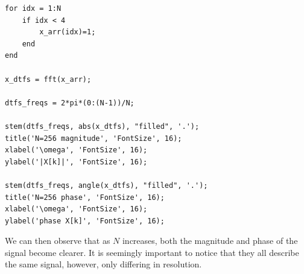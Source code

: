 \documentclass[12pt]{article}
\begin{document}
\begin{enumerate}[label=\textbf{\alph*)}, leftmargin=2.6em]
\begin{verbatim}
for idx = 1:N
    if idx < 4
        x_arr(idx)=1;
    end
end

x_dtfs = fft(x_arr);

dtfs_freqs = 2*pi*(0:(N-1))/N;

stem(dtfs_freqs, abs(x_dtfs), "filled", '.');
title('N=256 magnitude', 'FontSize', 16);
xlabel('\omega', 'FontSize', 16);
ylabel('|X[k]|', 'FontSize', 16);

stem(dtfs_freqs, angle(x_dtfs), "filled", '.');
title('N=256 phase', 'FontSize', 16);
xlabel('\omega', 'FontSize', 16);
ylabel('phase X[k]', 'FontSize', 16);
\end{verbatim}

We can then observe that as $N$ increases, both the magnitude and phase of the signal become clearer. It is seemingly important to notice that they all describe the same signal, however, only differing in resolution.

\end{enumerate}
\end{document}
